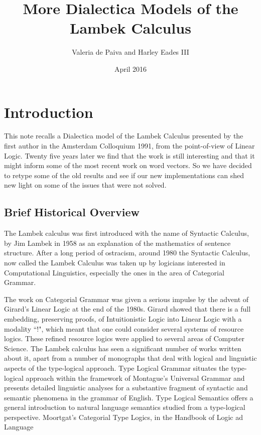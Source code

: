 \documentclass{article}
\title{More Dialectica Models of the Lambek Calculus}
\author{Valeria de Paiva and Harley Eades III}
\date{April 2016}
\begin{document}
\maketitle

\section*{Introduction}
This   note recalls a Dialectica model of the Lambek Calculus presented by the first author in the Amsterdam Colloquium 1991,
from the point-of-view of Linear Logic. Twenty five years later we find that the work is still interesting and that it might inform some of the most recent work on word vectors. So we have decided to retype some of the old results and see if our new implementations can shed new light on some of the issues that were not solved. 

\subsection*{Brief Historical Overview}
The Lambek calculus was first introduced  with the name of Syntactic Calculus, by Jim Lambek in 1958  as an explanation of the mathematics of sentence structure.  After a long period of ostracism, around 1980 the Syntactic Calculus, now called the Lambek Calculus was taken up by logicians interested in Computational Linguistics, especially the ones in the area of Categorial Grammar. 

The work on Categorial Grammar was given a serious impulse by  the advent of Girard's Linear Logic at the end of the 1980s.  Girard showed that there is a full embedding, preserving proofs, of Intuitionistic Logic into Linear Logic with a modality ``!", which meant that one could consider several systems of resource logics. These refined resource logics were applied to several areas of Computer Science. The Lambek calculus has seen a significant number of works written about it, apart from a number of monographs that
deal with logical and linguistic aspects of the type-logical
approach.
Type Logical Grammar situates
the type-logical
approach
within
the framework of Montague's
Universal Grammar
and
presents detailed
linguistic
analyses
for a substantive fragment of syntactic
and semantic phenomena
in the grammar
of English.
Type Logical Semantics
 offers
a general
introduction
to natural language
semantics studied
from a type-logical
perspective. Moortgat's Categorial
Type Logics, in the Handbook of Logic ad Language
\end{document}
